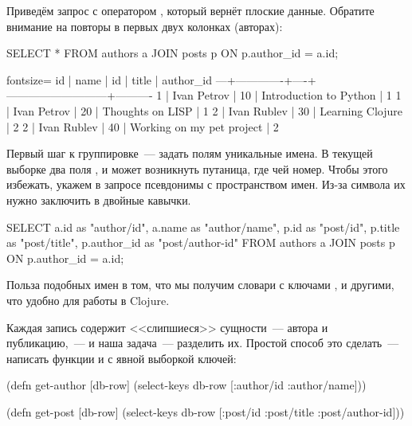 Приведём запрос с оператором , который вернёт плоские данные. Обратите внимание на повторы в первых двух колонках (авторах):

\begin{english}
  \begin{sql}
SELECT *
FROM authors a
JOIN posts p ON p.author_id = a.id;
  \end{sql}
\end{english}

\begin{english}
  \begin{text*}{fontsize=\small}
id |    name     | id |            title          | author_id
---+-------------+----+---------------------------+----------
 1 | Ivan Petrov | 10 | Introduction to Python    |         1
 1 | Ivan Petrov | 20 | Thoughts on LISP          |         1
 2 | Ivan Rublev | 30 | Learning Clojure          |         2
 2 | Ivan Rublev | 40 | Working on my pet project |         2
  \end{text*}
\end{english}

Первый шаг к группировке~--- задать полям уникальные имена. В текущей выборке два поля , и может возникнуть путаница, где чей номер. Чтобы этого избежать, укажем в запросе псевдонимы с пространством имен. Из-за символа \code{/} их нужно заключить в двойные кавычки.

\begin{english}
  \begin{sql}
SELECT
  a.id        as "author/id",
  a.name      as "author/name",
  p.id        as "post/id",
  p.title     as "post/title",
  p.author_id as "post/author-id"
FROM authors a
JOIN posts p ON p.author_id = a.id;
  \end{sql}
\end{english}

Польза подобных имен в том, что мы получим словари с ключами ,  и другими, что удобно для работы в Clojure.

Каждая запись содержит <<слипшиеся>> сущности~--- автора и публикацию,~--- и наша задача~--- разделить их. Простой способ это сделать~--- написать функции  и  с явной выборкой ключей:

\begin{english}
  \begin{clojure}
(defn get-author [db-row]
  (select-keys db-row [:author/id :author/name]))

(defn get-post [db-row]
  (select-keys db-row
    [:post/id :post/title :post/author-id]))
  \end{clojure}
\end{english}

